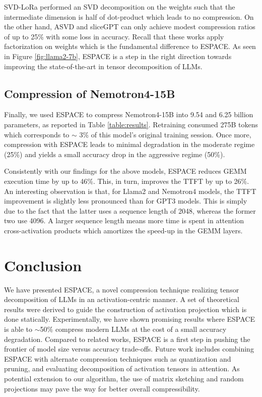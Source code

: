 \documentclass{article}
\theoremstyle{plain}
\begin{document}
SVD-LoRa performed an SVD decomposition on the weights such that the intermediate dimension is half of dot-product which leads to no compression. On the other hand, ASVD and sliceGPT can only achieve modest compression ratios of up to 25\% with some loss in accuracy. Recall that these works apply factorization on weights which is the fundamental difference to ESPACE. As seen in Figure \ref{fig:llama2-7b}, ESPACE is a step in the right direction towards improving the state-of-the-art in tensor decomposition of LLMs. 

\subsection{Compression of Nemotron4-15B}
Finally, we used ESPACE to compress Nemotron4-15B into 9.54 and 6.25 billion parameters, as reported in Table \ref{table:results}. Retraining consumed 275B tokens which corresponds to $\sim$ 3\% of this model's original training session. Once more, compression with ESPACE leads to minimal degradation in the moderate regime (25\%) and yields a small accuracy drop in the aggressive regime (50\%).

Consistently with our findings for the above models, ESPACE reduces GEMM execution time by up to 46\%. This, in turn, improves the TTFT by up to 26\%. An interesting observation is that, for Llama2 and Nemotron4 models, the TTFT improvement is slightly less pronounced than for GPT3 models. This is simply due to the fact that the latter uses a sequence length of 2048, whereas the former two use 4096. A larger sequence length means more time is spent in attention cross-activation products which amortizes the speed-up in the GEMM layers.

\section{Conclusion}
We have presented ESPACE, a novel compression technique realizing tensor decomposition of LLMs in an activation-centric manner. A set of theoretical results were derived to guide the construction of activation projection which is done statically. Experimentally, we have shown promising results where ESPACE is able to $\sim$50\% compress modern LLMs at the cost of a small accuracy degradation. Compared to related works, ESPACE is a first step in pushing the frontier of model size versus accuracy trade-offs. Future work includes combining ESPACE with alternate compression techniques such as quantization and pruning, and evaluating decomposition of activation tensors in attention. As potential extension to our algorithm, the use of matrix sketching and random projections may pave the way for better overall compressibility.
\end{document}
